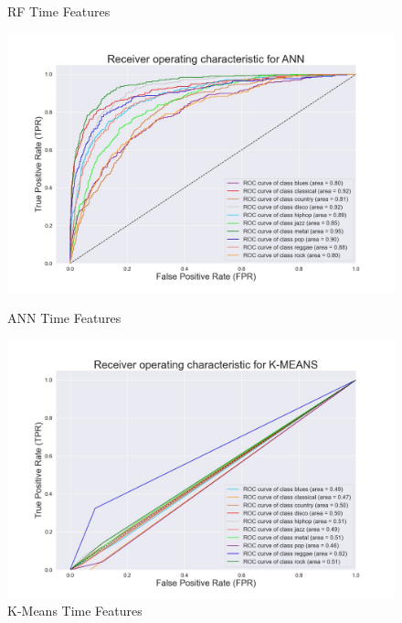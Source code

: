 \documentclass[conference]{IEEEtran}
\begin{document}
\begin{figure}[!ht]
\begin{center}
\begin{minipage}[t]{.24\textwidth}
            \caption{RF Time Features}
            \label{fig:RF Time Features}
        \end{minipage}
        \begin{minipage}[t]{.24\textwidth}
            \centering
            \includegraphics[width=\textwidth]{plot/SL/time_features/ANN_10000_10GEN_GTZAN - ROC Plot.jpg}
            \caption{ANN Time Features}
            \label{fig:ANN Time Features}
        \end{minipage}
        \begin{minipage}[t]{.24\textwidth}
            \centering
            \includegraphics[width=\textwidth]{plot/UL/time_features/10000_10GEN_GTZAN - ROC Plot.jpg}
            \caption{K-Means Time Features}
            \label{fig:K-Means Time Features}
        \end{minipage}
    \end{center}
\end{figure}
\end{document}
